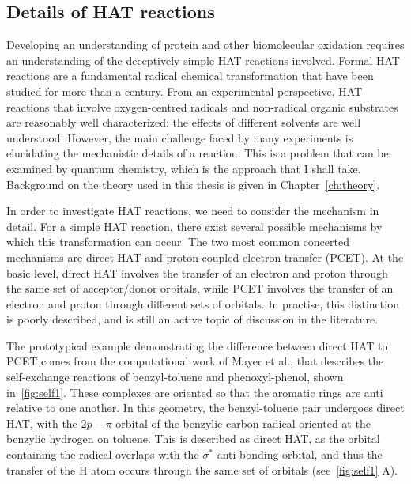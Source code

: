 \begin{doublespace}
\section{Details of HAT reactions}

Developing an understanding of protein and other biomolecular oxidation requires
an understanding of the deceptively simple HAT reactions involved. Formal HAT
reactions are a fundamental radical chemical transformation that have been
studied for more than a century.\cite{Kochi1973, Parsons2000} From an
experimental perspective, HAT reactions that involve oxygen-centred radicals
and non-radical organic substrates are reasonably well characterized: the
effects of different solvents are well understood.\cite{Litwinienko2007}
However, the main challenge faced by many experiments is elucidating the
mechanistic details of a reaction. This is a problem that can be examined by
quantum chemistry, which is the approach that I shall take. Background on the
theory used in this thesis is given in Chapter~\ref{ch:theory}.

In order to investigate HAT reactions, we need to consider the mechanism in
detail. For a simple HAT reaction, there exist several possible mechanisms by
which this transformation can occur. The two most common concerted mechanisms
are direct HAT and proton-coupled electron transfer (PCET). At the basic level,
direct HAT involves the transfer of an electron and proton through the same set
of acceptor/donor orbitals, while PCET involves the transfer of an electron and
proton through different sets of orbitals. In practise, this distinction is
poorly described, and is still an active topic of discussion in the
literature.\cite{Cukier1998, Mayer2002, Stubbe2003, Mayer2004, DiLabio2007,
Huynh2007, HammesSchiffer2008, Mayer2010, Weinberg2012, HammesSchiffer2015,
MunozRugeles2017}

The prototypical example demonstrating the difference between direct HAT to PCET
comes from the computational work of Mayer et al.,\cite{Mayer2002} that
describes the self-exchange reactions of benzyl-toluene and phenoxyl-phenol,
shown in~\ref{fig:self1}. These complexes are oriented so that the aromatic
rings are anti relative to one another. In this geometry, the benzyl-toluene
pair undergoes direct HAT, with the $2p-\pi$ orbital of the benzylic carbon
radical oriented at the benzylic hydrogen on toluene. This is described as
direct HAT, as the orbital containing the radical overlaps with the 
$\sigma^*$ anti-bonding orbital, and thus the transfer of the H atom occurs
through the same set of orbitals (see~\ref{fig:self1} A).


\end{doublespace}
